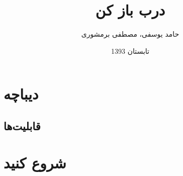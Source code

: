 \documentclass{../style/Boostan-UserManual}
\title{درب باز کن \lr{RC-D001}}
\author{حامد یوسفی، مصطفی برمشوری}
\date{تابستان 1393}
\begin{document}
\maketitle
\tableofcontents

\chapter{دیباچه}


\section{قابلیت‌ها}


\chapter{شروع کنید}


 
\end{document}
